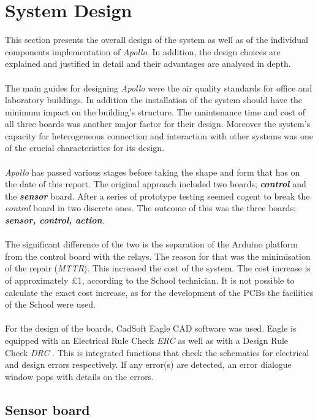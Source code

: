 \documentclass[12pt,a4paper,draft]{report}
\begin{document}
\chapter{System Design}
This section presents the overall design of the system as well as of the individual components implementation of \emph{Apollo}. In addition, the design choices are explained and justified in detail and their advantages are analysed in depth.\\
\ \\
The main guides for designing \emph{Apollo} were the air quality standards for office and laboratory buildings. In addition the installation of the system should have the minimum impact on the building's structure. The maintenance time and cost of all three boards was another major factor for their design. Moreover the system's capacity for heterogeneous connection and interaction with other systems was one of the crucial characteristics for its design. \\
\ \\
\emph{Apollo} has passed various stages before taking the shape and form that has on the date of this report. The original approach included two boards; \textbf{\textit{control}} and the \textbf{\textit{sensor}} board. After a series of prototype testing seemed cogent to break the \textit{control} board in two discrete ones. The outcome of this was the three boards; \textbf{\textit{sensor, control, action}}.\\
\ \\
The significant difference of the two is the separation of the Arduino platform from the control board with the relays. The reason for that was the minimisation of the repair (\textit{MTTR}). This increased the cost of the system. The cost increase is of approximately £1, according to the School technician. It is not possible to calculate the exact cost increase, as for the development of the PCBs the facilities of the School were used.\\
\ \\
For the design of the boards, CadSoft Eagle CAD software was used. Eagle is equipped with an Electrical Rule Check \textit{ERC} as well as with a Design Rule Check \textit{DRC} . This is integrated functions that check the schematics for electrical and design errors respectively. If any error(s) are detected, an error dialogue window pops with details on the errors.
%
\section{Sensor board}
\end{document}
